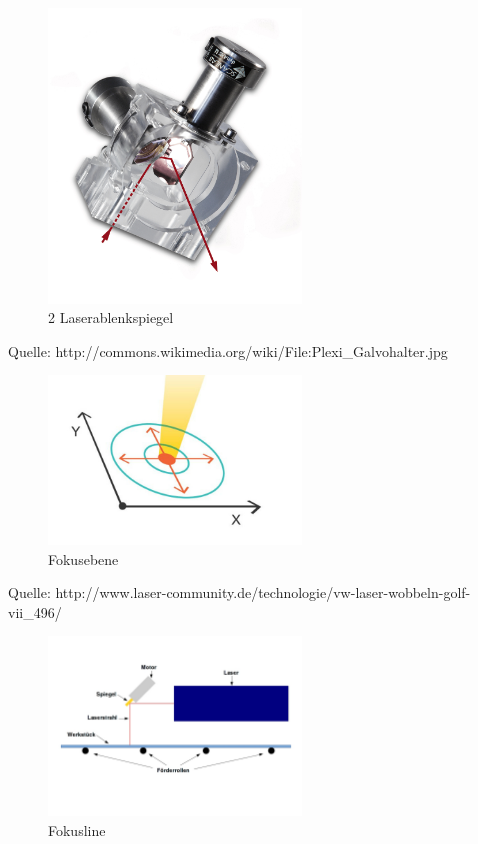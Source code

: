 \newpage


{\small \listoffigures}
\label{Abbildungsverzeichnis}

\begin{figure}[ht]
	\centering
	\includegraphics[width=0.6\textwidth]{Plexi_Galvohalter.jpg}
	\caption{2 Laserablenkspiegel\cite{wiki}}
	\label{galvohalter}
\end{figure}
Quelle: http://commons.wikimedia.org/wiki/File:Plexi_Galvohalter.jpg


\begin{figure}[ht]
	\centering
	\includegraphics[width=0.6\textwidth]{Strahlfuehrung.jpg}
	\caption{Fokusebene\cite{lasercommunity}}
	\label{fokusebene}
\end{figure}
Quelle: http://www.laser-community.de/technologie/vw-laser-wobbeln-golf-vii_496/


\begin{figure}[ht]
	\centering
	\includegraphics[width=0.6\textwidth]{Allgmeiner_Aufbau.jpg}
	\caption{Fokusline\cite{selbstgemalt}}
	\label{fokuslinie}
\end{figure}


